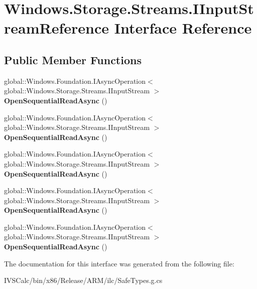 \hypertarget{interface_windows_1_1_storage_1_1_streams_1_1_i_input_stream_reference}{}\section{Windows.\+Storage.\+Streams.\+I\+Input\+Stream\+Reference Interface Reference}
\label{interface_windows_1_1_storage_1_1_streams_1_1_i_input_stream_reference}
\subsection*{Public Member Functions}
\begin{DoxyCompactItemize}
\item 
\mbox{\label{interface_windows_1_1_storage_1_1_streams_1_1_i_input_stream_reference_afdbce9ac218db8f884eefc598dcba25c}} 
global\+::\+Windows.\+Foundation.\+I\+Async\+Operation$<$ global\+::\+Windows.\+Storage.\+Streams.\+I\+Input\+Stream $>$ {\bfseries Open\+Sequential\+Read\+Async} ()
\item 
\mbox{\label{interface_windows_1_1_storage_1_1_streams_1_1_i_input_stream_reference_afdbce9ac218db8f884eefc598dcba25c}} 
global\+::\+Windows.\+Foundation.\+I\+Async\+Operation$<$ global\+::\+Windows.\+Storage.\+Streams.\+I\+Input\+Stream $>$ {\bfseries Open\+Sequential\+Read\+Async} ()
\item 
\mbox{\label{interface_windows_1_1_storage_1_1_streams_1_1_i_input_stream_reference_afdbce9ac218db8f884eefc598dcba25c}} 
global\+::\+Windows.\+Foundation.\+I\+Async\+Operation$<$ global\+::\+Windows.\+Storage.\+Streams.\+I\+Input\+Stream $>$ {\bfseries Open\+Sequential\+Read\+Async} ()
\item 
\mbox{\label{interface_windows_1_1_storage_1_1_streams_1_1_i_input_stream_reference_afdbce9ac218db8f884eefc598dcba25c}} 
global\+::\+Windows.\+Foundation.\+I\+Async\+Operation$<$ global\+::\+Windows.\+Storage.\+Streams.\+I\+Input\+Stream $>$ {\bfseries Open\+Sequential\+Read\+Async} ()
\item 
\mbox{\label{interface_windows_1_1_storage_1_1_streams_1_1_i_input_stream_reference_afdbce9ac218db8f884eefc598dcba25c}} 
global\+::\+Windows.\+Foundation.\+I\+Async\+Operation$<$ global\+::\+Windows.\+Storage.\+Streams.\+I\+Input\+Stream $>$ {\bfseries Open\+Sequential\+Read\+Async} ()
\end{DoxyCompactItemize}


The documentation for this interface was generated from the following file\+:\begin{DoxyCompactItemize}
\item 
I\+V\+S\+Calc/bin/x86/\+Release/\+A\+R\+M/ilc/Safe\+Types.\+g.\+cs\end{DoxyCompactItemize}
